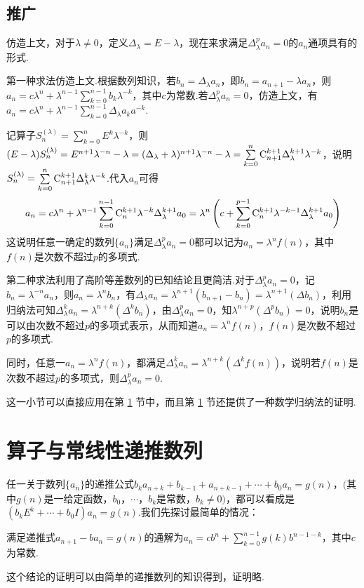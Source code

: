 \documentclass[10pt]{article}
\newcommand*{\D}{\text{，}}
\newcommand*{\SL}{\sum\limits}
\newcommand*{\rC}{{\rm C}}
\numberwithin{equation}{section}
\begin{document}
\subsection{推广}
\par 仿造上文，对于$\lambda \ne 0$，定义$\Delta_\lambda = E-\lambda$，现在来求满足$\Delta_\lambda^p a_n = 0$的$a_n$通项具有的形式.
\par 第一种求法仿造上文.根据数列知识，若$b_n = \Delta_\lambda a_n$，即$b_n = a_{n+1} - \lambda a_{n}$，则$a_{n} = c\lambda^{n} + \lambda^{n-1}\SL_{k=0}^{n-1}{b_{k}\lambda^{-k}}$，其中$c$为常数.若$\Delta_\lambda^p a_n = 0$，仿造上文，有$a_n = c\lambda^n + \lambda^{n-1}\SL_{k=0}^{n-1}{\Delta_\lambda a_{k}a^{-k}}$.
\par 记算子$S_n^{(\lambda)} = \SL_{k=0}^{n}{E^k\lambda^{-k}}$，则$(E-\lambda)S_n^{(\lambda)} = E^{n+1}\lambda^{-n} - \lambda = (\Delta_\lambda + \lambda)^{n+1}\lambda^{-n} - \lambda = \SL_{k=0}^{n}{\rC_{n+1}^{k+1}\Delta_\lambda^{k+1}\lambda^{-k}}$，说明$S_{n}^{(\lambda)} = \SL_{k=0}^{n}{\rC_{n+1}^{k+1}\Delta_\lambda^{k}\lambda^{-k}}$.代入$a_n$可得
\[
    a_n = c\lambda^{n} + \lambda^{n-1}\sum_{k=0}^{n-1}{\rC_{n}^{k+1}\lambda^{-k}\Delta_\lambda^{k+1}a_0} = \lambda^{n}\left(c+\sum_{k=0}^{p-1}{\rC_{n}^{k+1}\lambda^{-k-1}\Delta_\lambda^{k+1}a_0}\right)
\]
这说明任意一确定的数列$\{a_n\}$满足$\Delta_\lambda^p a_n = 0$都可以记为$a_n=\lambda^nf(n)$，其中$f(n)$是次数不超过$p$的多项式.
\par 第二种求法利用了高阶等差数列的已知结论且更简洁.对于$\Delta_\lambda^p a_n = 0$，记$b_n = \lambda^{-n}a_n$，则$a_n = \lambda^nb_n$，有$\Delta_\lambda a_n = \lambda^{n+1}(b_{n+1}-b_n) = \lambda^{n+1}(\Delta b_n)$，利用归纳法可知$\Delta_\lambda^k a_n= \lambda^{n+k}(\Delta^{k}b_n)$，由$\Delta_\lambda^p a_n = 0$，知$\lambda^{n+p}(\Delta^p b_n) = 0$，说明$b_n$是可以由次数不超过$p$的多项式表示，从而知道$a_n = \lambda^{n}f(n)$，$f(n)$是次数不超过$p$的多项式.
\par 同时，任意一$a_n = \lambda^nf(n)$，都满足$\Delta_\lambda^k a_n = \lambda^{n+k}(\Delta^k f(n))$，说明若$f(n)$是次数不超过$p$的多项式，则$\Delta_\lambda^{p} a_n = 0$.
\par 这一小节可以直接应用在第 \ref{dt} 节中，而且第 \ref{dt} 节还提供了一种数学归纳法的证明.
\section{算子与常线性递推数列} \label{dt}
\par 任一关于数列$\{a_n\}$的递推公式$b_ka_{n+k}+b_{k-1}+a_{n+k-1}+\cdots+b_{0}a_{n}=g(n)$，$($其中$g(n)$是一给定函数，$b_0\D \cdots \D b_k$是常数，$b_k \ne 0$$)$，都可以看成是$\left(b_kE^{k} + \cdots + b_0I\right)a_n = g(n)$.我们先探讨最简单的情况：
\begin{YL} \label{yl1}
    满足递推式$a_{n+1}-ba_{n} = g(n)$的通解为$a_n = cb^n+\SL_{k=0}^{n-1}{g(k)b^{n-1-k}}$，其中$c$为常数.
\end{YL}
这个结论的证明可以由简单的递推数列的知识得到，证明略.
\end{document}
